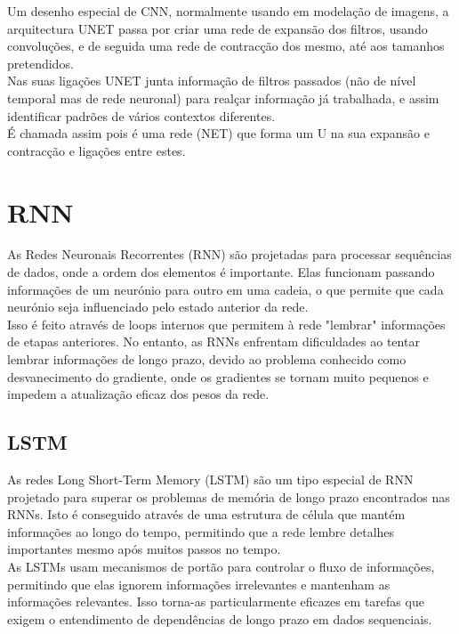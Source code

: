 Um desenho especial de CNN, normalmente usando em modelação de imagens, a arquitectura UNET passa por criar uma rede de expansão dos filtros, usando convoluções, e de seguida uma rede de contracção dos mesmo, até aos tamanhos pretendidos.\\
Nas suas ligações UNET junta informação de filtros passados (não de nível temporal mas de rede neuronal) para realçar informação já trabalhada, e assim identificar padrões de vários contextos diferentes.\\
É chamada assim pois é uma rede (NET) que forma um U na sua expansão e contracção e ligações entre estes.\\


\section{RNN\label{se:rnn_sec}}

As Redes Neuronais Recorrentes (RNN) são projetadas para processar sequências de dados, onde a ordem dos elementos é importante. Elas funcionam passando informações de um neurónio para outro em uma cadeia, o que permite que cada neurónio seja influenciado pelo estado anterior da rede.\\
Isso é feito através de loops internos que permitem à rede "lembrar" informações de etapas anteriores. No entanto, as RNNs enfrentam dificuldades ao tentar lembrar informações de longo prazo, devido ao problema conhecido como desvanecimento do gradiente, onde os gradientes se tornam muito pequenos e impedem a atualização eficaz dos pesos da rede.\\

\subsection{LSTM\label{se:lstms_sec}}

As redes Long Short-Term Memory (LSTM) são um tipo especial de RNN projetado para superar os problemas de memória de longo prazo encontrados nas RNNs. Isto é conseguido através de uma estrutura de célula que mantém informações ao longo do tempo, permitindo que a rede lembre detalhes importantes mesmo após muitos passos no tempo.\\
As LSTMs usam mecanismos de portão para controlar o fluxo de informações, permitindo que elas ignorem informações irrelevantes e mantenham as informações relevantes. Isso torna-as particularmente eficazes em tarefas que exigem o entendimento de dependências de longo prazo em dados sequenciais.\\

